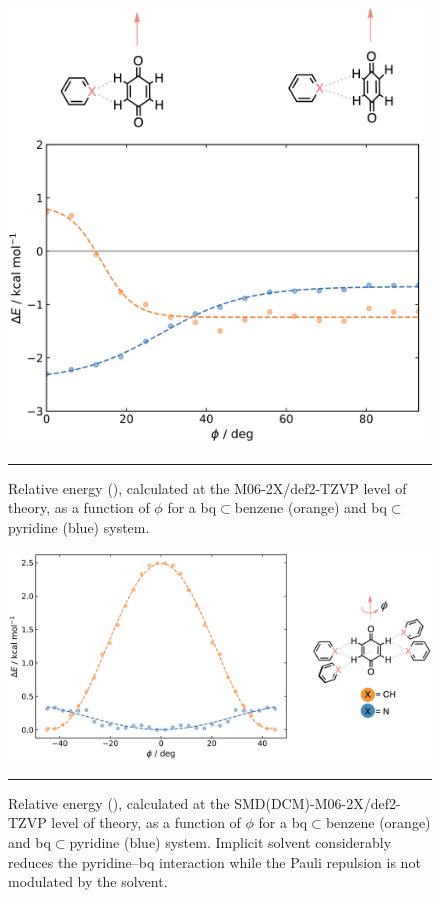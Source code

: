 \documentclass[../../main.tex]{subfiles}
\begin{document}
\begin{figure}[h!]
	\vspace{0.4cm}
	\centering
	\includegraphics[width=11cm]{3/da//figs/figS18}
	\vspace{0.2cm}
	\hrule
	\caption{Relative energy (\kcal), calculated at the M06-2X/def2-TZVP level of theory, as a function of $\phi$ for a bq$\subset$benzene (orange) and bq$\subset$pyridine (blue) system.}
	\label{fig::si_da_18}
\end{figure}



\begin{figure}[h!]
	\vspace{0.4cm}
	\centering
	\includegraphics[width=\textwidth]{3/da//figs/figS19}
	\vspace{0.2cm}
	\hrule
	\caption{Relative energy (\kcal), calculated at the SMD(DCM)-M06-2X/def2-TZVP level of theory, as a function of $\phi$ for a bq$\subset$benzene (orange) and bq$\subset$pyridine (blue) system. Implicit solvent considerably reduces the pyridine–bq interaction while the Pauli repulsion is not modulated by the solvent.}
	\label{fig::si_da_19}
\end{figure}
\end{document}
